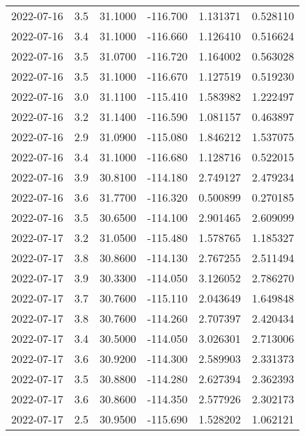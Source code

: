 \begin{tabular}{lrrrrr}
2022-07-16 &       3.5 &  31.1000 &  -116.700 &         1.131371 &         0.528110 \\
2022-07-16 &       3.4 &  31.1000 &  -116.660 &         1.126410 &         0.516624 \\
2022-07-16 &       3.5 &  31.0700 &  -116.720 &         1.164002 &         0.563028 \\
2022-07-16 &       3.5 &  31.1000 &  -116.670 &         1.127519 &         0.519230 \\
2022-07-16 &       3.0 &  31.1100 &  -115.410 &         1.583982 &         1.222497 \\
2022-07-16 &       3.2 &  31.1400 &  -116.590 &         1.081157 &         0.463897 \\
2022-07-16 &       2.9 &  31.0900 &  -115.080 &         1.846212 &         1.537075 \\
2022-07-16 &       3.4 &  31.1000 &  -116.680 &         1.128716 &         0.522015 \\
2022-07-16 &       3.9 &  30.8100 &  -114.180 &         2.749127 &         2.479234 \\
2022-07-16 &       3.6 &  31.7700 &  -116.320 &         0.500899 &         0.270185 \\
2022-07-16 &       3.5 &  30.6500 &  -114.100 &         2.901465 &         2.609099 \\
2022-07-17 &       3.2 &  31.0500 &  -115.480 &         1.578765 &         1.185327 \\
2022-07-17 &       3.8 &  30.8600 &  -114.130 &         2.767255 &         2.511494 \\
2022-07-17 &       3.9 &  30.3300 &  -114.050 &         3.126052 &         2.786270 \\
2022-07-17 &       3.7 &  30.7600 &  -115.110 &         2.043649 &         1.649848 \\
2022-07-17 &       3.8 &  30.7600 &  -114.260 &         2.707397 &         2.420434 \\
2022-07-17 &       3.4 &  30.5000 &  -114.050 &         3.026301 &         2.713006 \\
2022-07-17 &       3.6 &  30.9200 &  -114.300 &         2.589903 &         2.331373 \\
2022-07-17 &       3.5 &  30.8800 &  -114.280 &         2.627394 &         2.362393 \\
2022-07-17 &       3.6 &  30.8600 &  -114.350 &         2.577926 &         2.302173 \\
2022-07-17 &       2.5 &  30.9500 &  -115.690 &         1.528202 &         1.062121 \\

\end{tabular}
